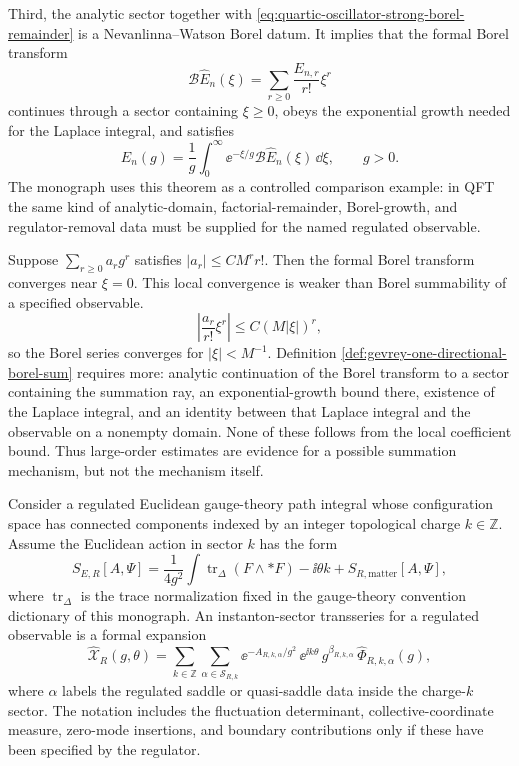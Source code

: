 Third, the analytic sector together with
\eqref{eq:quartic-oscillator-strong-borel-remainder} is a
Nevanlinna--Watson Borel datum.  It implies that the formal Borel transform
\[
  \mathcal B\widehat E_n(\xi)
  =
  \sum_{r\ge0}\frac{E_{n,r}}{r!}\xi^r
\]
continues through a sector containing \(\xi\ge0\), obeys the exponential
growth needed for the Laplace integral, and satisfies
\[
  E_n(g)
  =
  \frac1g\int_0^\infty
  \ee^{-\xi/g}\mathcal B\widehat E_n(\xi)\,\dd\xi ,
  \qquad g>0 .
\]
The monograph uses this theorem as a controlled comparison example: in QFT
the same kind of analytic-domain, factorial-remainder, Borel-growth, and
regulator-removal data must be supplied for the named regulated observable.

\begin{remark}
\label{rem:coefficient-growth-not-borel-summability}
Suppose \(\sum_{r\ge0}a_rg^r\) satisfies \(|a_r|\le C M^r r!\).
Then the formal Borel transform converges near \(\xi=0\).  This local
convergence is weaker than Borel summability of a specified observable.
\[
  \left|\frac{a_r}{r!}\xi^r\right|
  \le C(M|\xi|)^r ,
\]
so the Borel series converges for \(|\xi|<M^{-1}\).  Definition
\ref{def:gevrey-one-directional-borel-sum} requires more: analytic
continuation of the Borel transform to a sector containing the summation ray,
an exponential-growth bound there, existence of the Laplace integral, and an
identity between that Laplace integral and the observable on a nonempty domain.
None of these follows from the local coefficient bound.  Thus large-order
estimates are evidence for a possible summation mechanism, but not the
mechanism itself.
\end{remark}

\begin{definition}
\label{def:instanton-sector-transseries}
Consider a regulated Euclidean gauge-theory path integral whose configuration
space has connected components indexed by an integer topological charge
\(k\in\mathbb Z\).  Assume the Euclidean action in sector \(k\) has the form
\begin{equation}
  S_{E,R}[A,\Psi]
  =
  \frac{1}{4g^2}\int \operatorname{tr}_\Delta(F\wedge *F)
  -\ii\theta k
  +S_{R,\mathrm{matter}}[A,\Psi],
  \label{eq:instanton-sector-action}
\end{equation}
where \(\operatorname{tr}_\Delta\) is the trace normalization fixed in the
gauge-theory convention dictionary of this monograph.  An instanton-sector
transseries for a regulated observable is a formal expansion
\begin{equation}
  \widehat{\mathcal X}_R(g,\theta)
  =
  \sum_{k\in\mathbb Z}
  \sum_{\alpha\in\mathcal S_{R,k}}
  \ee^{-A_{R,k,\alpha}/g^2}\,
  \ee^{\ii k\theta}\,
  g^{\beta_{R,k,\alpha}}\,
  \widehat\Phi_{R,k,\alpha}(g),
  \label{eq:instanton-sector-transseries}
\end{equation}
where \(\alpha\) labels the regulated saddle or quasi-saddle data inside the
charge-\(k\) sector.  The notation includes the fluctuation determinant,
collective-coordinate measure, zero-mode insertions, and boundary
contributions only if these have been specified by the regulator.
\end{definition}

